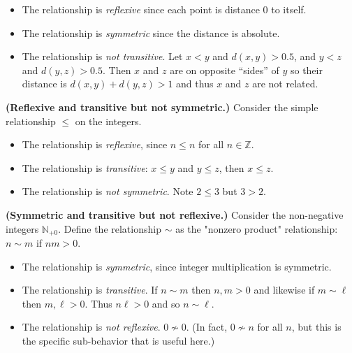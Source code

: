 \documentclass{article}
\begin{document}
\begin{itemize}
  \item The relationship is \textit{reflexive} since each point is distance 0
    to itself.
  \item The relationship is \textit{symmetric} since the distance is absolute.
  \item The relationship is \textit{not transitive}. Let $x < y$ and $d(x,y)
    > 0.5$, and $y < z$ and $d(y, z) > 0.5$. Then $x$ and $z$ are on opposite
    ``sides'' of $y$ so their distance is $d(x, y) + d(y, z) > 1$ and thus
    $x$ and $z$ are not related.
\end{itemize}

\vspace{0.5cm}

\textbf{(Reflexive and transitive but not symmetric.)} Consider the simple
relationship $\leq$ on the integers.

\begin{itemize}
  \item The relationship is \textit{reflexive}, since $n \leq n$ for all $n \in
    \mathbb{Z}$.
  \item The relationship is \textit{transitive}: $x \leq y$ and $y \leq z$,
    then $x \leq z$.
  \item The relationship is \textit{not symmetric}. Note $2 \leq 3$ but $3
    > 2$.
\end{itemize}

\vspace{0.5cm}

\textbf{(Symmetric and transitive but not reflexive.)} Consider the non-negative
integers $\mathbb{N}_{+0}$. Define the relationship $\sim$ as the "nonzero
product" relationship: $n \sim m$ if $nm > 0$.

\begin{itemize}
  \item The relationship is \textit{symmetric}, since integer multiplication is
    symmetric.
  \item The relationship is \textit{transitive}. If $n \sim m$ then $n, m > 0$
    and likewise if $m \sim \ell$ then $m, \ell > 0$. Thus $n\ell > 0$ and so
    $n \sim \ell$.
  \item The relationship is \textit{not reflexive}. $0 \not\sim 0$. (In fact,
    $0 \not\sim n$ for all $n$, but this is the specific sub-behavior that is
    useful here.)
\end{itemize}
\end{document}
